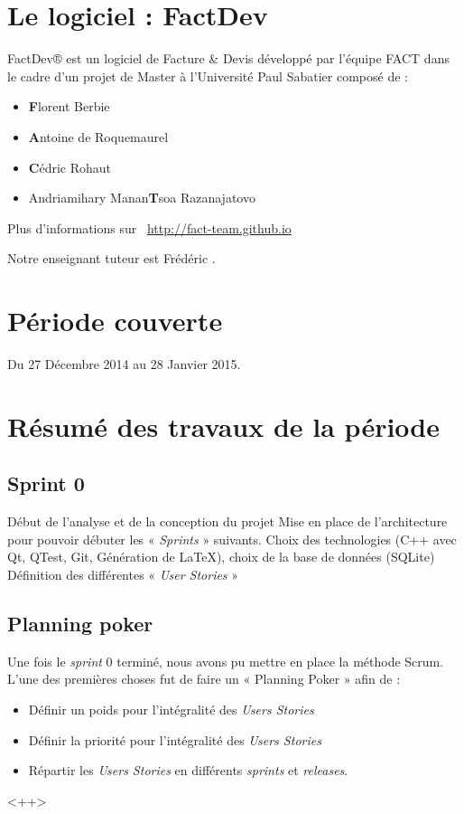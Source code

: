 \documentclass[12pt,a4paper,openany]{article}
\begin{document}
	\thispagestyle{empty} %
	\titleBC 
	\newpage
	\setcounter{tocdepth}{1}
	\setcounter{secnumdepth}{3}
	
	\tableofcontents
	\section{Le logiciel : FactDev}
	FactDev® est un logiciel de Facture \& Devis développé par l'équipe FACT dans le cadre d'un projet de Master à l'Université Paul Sabatier composé de : 
	\begin{itemize}
		\item \textbf{F}lorent Berbie
		\item \textbf{A}ntoine de Roquemaurel
		\item \textbf{C}édric Rohaut
		\item Andriamihary Manan\textbf{T}soa Razanajatovo
	\end{itemize}

	Plus d’informations sur \Mundus~\url{http://fact-team.github.io}

	Notre enseignant tuteur est Frédéric .

	\section{Période couverte}
	Du 27 Décembre 2014 au 28 Janvier 2015.

	\section{Résumé des travaux de la période}
	\subsection{Sprint 0}
	Début de l'analyse et de la conception du projet
	Mise en place de l'architecture pour pouvoir débuter les « \textit{Sprints} » suivants. 
	Choix des technologies (C++ avec Qt, QTest, Git, Génération de LaTeX), choix de la base de données (SQLite)
	Définition des différentes « \textit{User Stories} »

	\subsection{Planning poker}
	Une fois le \textit{sprint} 0 terminé, nous avons pu mettre en place la méthode Scrum. L’une des premières choses fut de faire un « Planning Poker » afin
	de : 
	\begin{itemize}
		\item Définir un poids pour l'intégralité des \textit{Users Stories}
		\item Définir la priorité pour l'intégralité des \textit{Users Stories}
		\item Répartir les \textit{Users Stories} en différents \textit{sprints} et \textit{releases}. 
	\end{itemize}<++>
\end{document}

